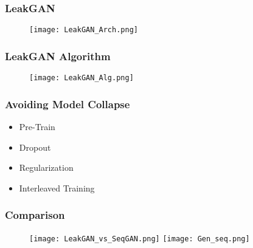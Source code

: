 \documentclass{beamer}
\begin{document}
\begin{frame}
\frametitle{LeakGAN}
\begin{figure}[ht]
  \texttt{[image: LeakGAN\_Arch.png]}
\end{figure}
\end{frame}

\begin{frame}
\frametitle{LeakGAN Algorithm}
\begin{figure}[ht]
  \texttt{[image: LeakGAN\_Alg.png]}
\end{figure}
\end{frame}

\begin{frame}
\frametitle{Avoiding Model Collapse}
\begin{itemize}
  \item Pre-Train
  \item Dropout
  \item Regularization
  \item Interleaved Training
\end{itemize}
\end{frame}

\begin{frame}
\frametitle{Comparison}
\begin{figure}[ht]
  \texttt{[image: LeakGAN\_vs\_SeqGAN.png]}
  \texttt{[image: Gen\_seq.png]}
\end{figure}
\end{frame}

% 
% 
% 
% 
% 
% 
% 
\end{document}
